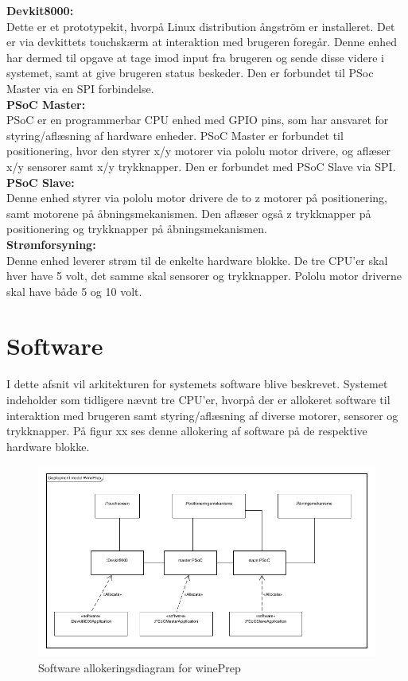 \textbf{Devkit8000:}\\ 
Dette er et prototypekit, hvorpå Linux distribution ångström er installeret. Det er via devkittets touchskærm at interaktion med brugeren foregår. 
Denne enhed har dermed til opgave at tage imod input fra brugeren og sende disse videre i systemet, samt at give brugeren status beskeder. Den er forbundet til
PSoc Master via en SPI forbindelse.\\

\textbf{PSoC Master:}\\
PSoC er en programmerbar CPU enhed med GPIO pins, som har ansvaret for styring/aflæsning af hardware enheder. PSoC Master er forbundet til positionering, 
hvor den styrer x/y motorer via pololu motor drivere, og aflæser x/y sensorer samt x/y trykknapper. Den er forbundet med PSoC Slave via SPI.\\  

\textbf{PSoC Slave:}\\
Denne enhed styrer via pololu motor drivere de to z motorer på positionering, samt motorene på åbningsmekanismen. Den aflæser også z trykknapper på 
positionering og trykknapper på åbningsmekanismen.\\  

\textbf{Strømforsyning:}\\
Denne enhed leverer strøm til de enkelte hardware blokke. De tre CPU'er skal hver have 5 volt, det samme skal sensorer og trykknapper. Pololu motor driverne 
skal have både 5 og 10 volt.\\

\section{Software}

I dette afsnit vil arkitekturen for systemets software blive beskrevet.
Systemet indeholder som tidligere nævnt tre CPU'er, hvorpå der er allokeret software til interaktion med brugeren samt styring/aflæsning af diverse 
motorer, sensorer og trykknapper. På figur xx ses denne allokering af software på de respektive hardware blokke.\\

\begin{figure}[H]
\includegraphics[scale=0.4]{tex/Arkitektur/Fotos/SW/Allokeringsdiagram}
\caption{Software allokeringsdiagram for winePrep}
\end{figure}  

